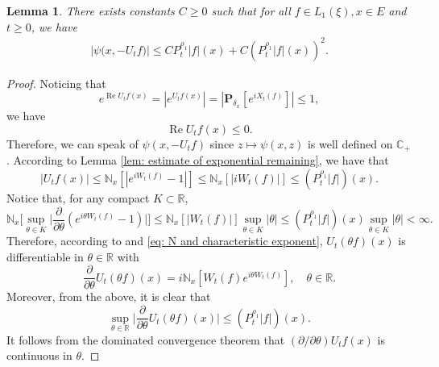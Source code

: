 \documentclass[12pt,a4paper]{amsart}
\theoremstyle{plain}
\newtheorem{lem}[thm]{Lemma}
\theoremstyle{definition}
\numberwithin{equation}{section}
\begin{document}
\begin{lem}
    There exists constants $C\geq 0$ such that for all $f \in L_1(\xi),x\in E$ and $t\geq 0$, we have
\begin{equation}\begin{split}
\label{eq: upper bound of psi(v)}
    \big|\psi\big(x,-U_tf\big)\big|
    \leq C P^{\rho_1}_t |f|(x)+
         C (P^{\rho_1}_t |f| (x))^2.
\end{split}\end{equation}
\end{lem}
\begin{proof}
     Noticing that
\[
     e^{\operatorname{Re} U_tf(x)}
    = |e^{U_tf(x)}|
    = |\mathbf P_{\delta_x}[e^{i X_t(f)}]|
    \leq 1,
\]
    we have
\begin{equation}
\label{eq: -v has positive real part}
 \operatorname{Re} U_tf(x)
    \leq 0.
\end{equation}
    Therefore, we can speak of $\psi(x,-U_tf)$ since $z\mapsto \psi(x,z)$ is well defined on $\mathbb C_+$.
    According to Lemma \ref{lem: estimate of exponential remaining}, we have that
\begin{equation}
\label{eq: upper bound for vf}
    |U_tf(x)| \leq \mathbb N_x[|e^{i W_t(f)} - 1|]
    \leq \mathbb N_x[|i W_t(f)|]
     \leq (P^{\rho_1}_t |f|)(x).
\end{equation}
    Notice that, for any compact $K \subset \mathbb R$,
\begin{equation}
\label{eq: estimate of deriavetive of v(theta)}
    \mathbb N_x\Big[\sup_{\theta \in K} \Big|\frac{\partial}{\partial \theta} (e^{i\theta W_t(f)} - 1) \Big|\Big]
    \leq \mathbb N_x[|W_t(f)|] \sup_{\theta \in K}|\theta|
        \leq (P^{\rho_1}_t |f|)(x) \sup_{\theta \in K}|\theta| < \infty.
\end{equation}
    Therefore, according to \cite[Theorem A.5.2.]{Durrett2010Probability} and \eqref{eq: N and characteristic exponent},
    $U_t(\theta f)(x)$ is differentiable in $\theta \in \mathbb R$ with
\[
    \frac{\partial}{\partial \theta} U_t(\theta f)(x)
    = i\mathbb N_x[W_t(f)e^{i\theta W_t(f)}],
    \quad \theta \in \mathbb R.
\]
    Moreover, from the above, it is clear that
\begin{equation}
\label{eq: upper bounded for derivative of v(theta)}
    \sup_{\theta \in \mathbb R}\Big| \frac{\partial}{\partial \theta}U_t(\theta f)(x)\Big|
         \leq ( P^{\rho_1}_t |f|)(x).
\end{equation}
    It follows from the dominated convergence theorem that $(\partial/\partial \theta)U_tf(x)$ is continuous in $\theta$.

\end{proof}
\end{document}
